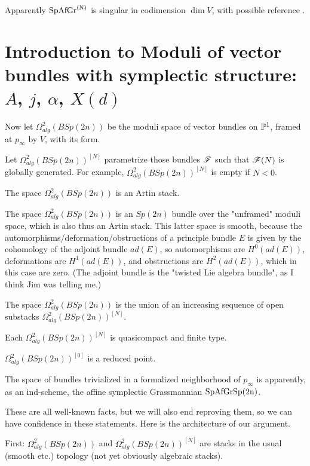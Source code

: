 {
Apparently $\rm{SpAfGr}^{(N)}$  is singular in codimension $\dim V$, with possible reference  \cite{mov}. 


\section{Introduction to Moduli of vector bundles with symplectic structure:  $A$, $j$, $\alpha$, $X(d)$}

Now let $\boxed{\Omega^2_{alg}(BSp(2n))}$  be the moduli space of vector bundles on $\mathbb P^1$, framed at $p_\infty$ by $V$, with its form.

Let $\boxed{\Omega^2_{alg}(BSp(2n))^{[N]}}$ parametrize those bundles ${\mathscr{F}}$ such that ${\mathscr{F}}(N)$ is globally generated. For example, 
$\Omega^2_{alg}(BSp(2n))^{[N]}$ is empty if $N<0$.

The space 
$\Omega^2_{alg}(BSp(2n))$ 
is an Artin stack.  

 The space 
$\Omega^2_{alg}(BSp(2n))$ is an $Sp(2n)$ bundle over the "unframed" moduli space, which is also thus an Artin stack.  This latter space is smooth, because the automorphisms/deformation/obstructions of a principle bundle $E$ is given by the cohomology of the adjoint bundle $ad(E)$, so automorphisms are $H^0(ad(E))$, deformations are $H^1(ad(E))$, and obstructions are $H^2(ad(E))$, which in this case are zero.  (The adjoint bundle is the "twisted Lie algebra bundle", as I think Jim was telling me.)



The space 
$\Omega^2_{alg}(BSp(2n))$  is the union of an increasing sequence of open substacks
$\Omega^2_{alg}(BSp(2n))^{[N]}$.

Each $\Omega^2_{alg}(BSp(2n))^{[N]}$ is quasicompact and finite type.  

$\Omega^2_{alg}(BSp(2n))^{[0]}$ is a reduced point.

The space of  bundles trivialized in a formalized neighborhood of $p_\infty$ is apparently, as an ind-scheme, the affine symplectic Grassmannian $\rm{SpAfGr}{Sp(2n)}$.

These are all well-known facts, but we will also end reproving them, so we can have confidence in these statements.  Here is the architecture of our argument.

First:
$\Omega^2_{alg}(BSp(2n))$ and $\Omega^2_{alg}(BSp(2n))^{[N]}$
are stacks in the usual (smooth etc.) topology (not yet obviously algebraic stacks).  

}
